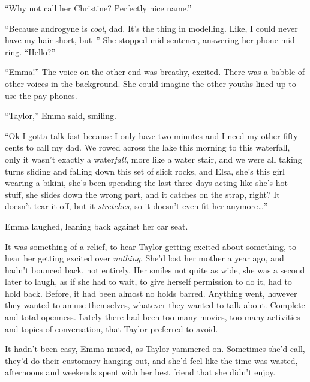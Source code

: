 ``Why not call her Christine?  Perfectly nice name.''



``Because androgyne is \emph{cool}, dad.  It's the thing in modelling.  Like, I could never have my hair short, but--''  She stopped mid-sentence, answering her phone mid-ring.  ``Hello?''



``Emma!''  The voice on the other end was breathy, excited.  There was a babble of other voices in the background.  She could imagine the other youths lined up to use the pay phones.



``Taylor,'' Emma said, smiling.



``Ok I gotta talk fast because I only have two minutes and I need my other fifty cents to call my dad.  We rowed across the lake this morning to this waterfall, only it wasn't exactly a water\emph{fall}, more like a water stair, and we were all taking turns sliding and falling down this set of slick rocks, and Elsa, she's this girl wearing a bikini, she's been spending the last three days acting like she's hot stuff, she slides down the wrong part, and it catches on the strap, right?  It doesn't tear it off, but it \emph{stretches, }so it doesn't even fit her anymore\emph{\ldots}''



Emma laughed, leaning back against her car seat.



It was something of a relief, to hear Taylor getting excited about something, to hear her getting excited over \emph{nothing}.  She'd lost her mother a year ago, and hadn't bounced back, not entirely.  Her smiles not quite as wide, she was a second later to laugh, as if she had to wait, to give herself permission to do it, had to hold back.  Before, it had been almost no holds barred.  Anything went, however they wanted to amuse themselves, whatever they wanted to talk about.  Complete and total openness.  Lately there had been too many movies, too many activities and topics of conversation, that Taylor preferred to avoid.



It hadn't been easy, Emma mused, as Taylor yammered on.  Sometimes she'd call, they'd do their customary hanging out, and she'd feel like the time was wasted, afternoons and weekends spent with her best friend that she didn't enjoy.



